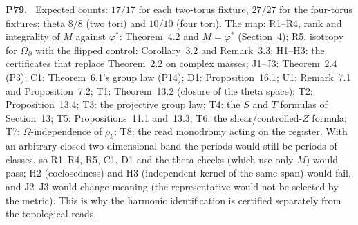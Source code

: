\documentclass[11pt]{article}
\newenvironment{solution}[1]{\medskip\noindent\textbf{P#1.}\ }{\par\medskip}
\begin{document}
\begin{solution}{79}
Expected counts: $17/17$ for each two-torus fixture, $27/27$ for the
four-torus fixtures; theta $8/8$ (two tori) and $10/10$ (four tori). The map:
R1--R4, rank and integrality of $M$ against $\varphi^*$: Theorem~4.2 and
$M = \varphi^*$ (Section~4); R5, isotropy for $\Omega_\partial$ with the flipped
control: Corollary~3.2 and Remark~3.3; H1--H3: the certificates that replace
Theorem~2.2 on complex masses; J1--J3: Theorem~2.4 (P3); C1:
Theorem~6.1's group law (P14); D1: Proposition~16.1; U1: Remark~7.1 and
Proposition~7.2; T1: Theorem~13.2 (closure of the theta space); T2:
Proposition~13.4; T3: the projective group law; T4: the $S$ and $T$ formulas
of Section~13; T5: Propositions~11.1 and~13.3; T6: the shear/controlled-$Z$
formula; T7: $\Omega$-independence of $\rho_k$; T8: the read monodromy acting
on the register. With an arbitrary closed two-dimensional band the periods
would still be periods of classes, so R1--R4, R5, C1, D1 and the theta checks
(which use only $M$) would pass; H2 (coclosedness) and H3 (independent kernel
of the same span) would fail, and J2--J3 would change meaning (the
representative would not be selected by the metric). This is why the harmonic
identification is certified separately from the topological reads.
\end{solution}
\end{document}
